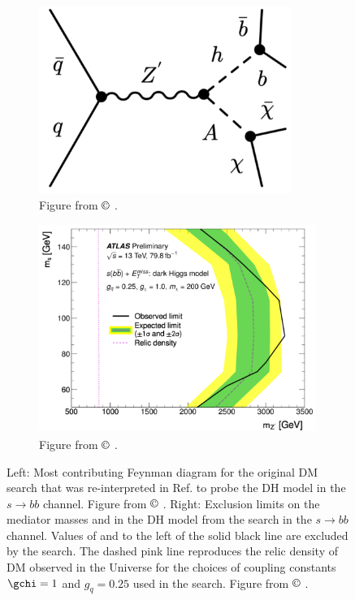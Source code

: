 \begin{figure}[hp]
	\centering
\begin{subfigure}[t]{0.41\textwidth}
	\centering
	\includegraphics[width=0.9\textwidth]{Figures/2/Fey_monoH.pdf}
\caption{Figure from $\copyright$ \cite{ATLAS-CONF-2018-039}.}
\label{fig:Fey_monoH}
\end{subfigure}
\begin{subfigure}[t]{0.57\textwidth}
	\centering
	\includegraphics[width=0.99\textwidth]{Figures/2/monosbb_limits.pdf}
\caption{Figure from $\copyright$ \cite{dijet_3}.}
\label{fig:monosbb_limits}
\end{subfigure}
	\caption{Left: Most contributing Feynman diagram for the original DM search \cite{ATLAS-CONF-2018-039} that was re-interpreted in Ref. \cite{ATL-PHYS-PUB-2019-032} to probe the DH model in the \(s\rightarrow bb\) channel. Figure from $\copyright$ \cite{ATLAS-CONF-2018-039}. Right: Exclusion limits on the mediator masses \ms and \mZp in the DH model from the search in the \(s\rightarrow bb\) channel.  Values of \ms and \mZp to the left of the solid black line are excluded by the search. The dashed pink line reproduces the relic density of DM observed in the Universe for the choices of coupling constants \(\gchi=1\) and \(g_q=0.25\) used in the search. Figure from $\copyright$ \cite{ATL-PHYS-PUB-2019-032}.}
	\label{fig:monosbb_DH_search}
\end{figure}

